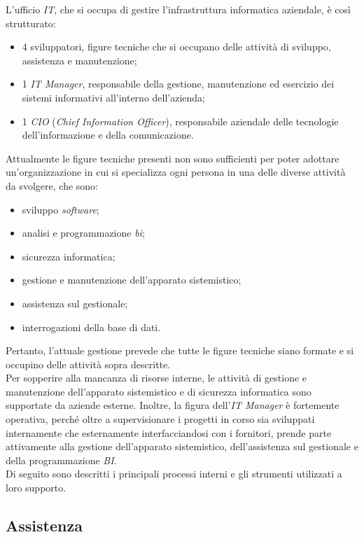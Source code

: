 L'ufficio \textit{IT}, che si occupa di gestire l'infrastruttura informatica aziendale, è così strutturato: 
\begin{itemize}
	\item 4 sviluppatori, figure tecniche che si occupano delle attività di sviluppo, assistenza e manutenzione; 
	\item 1 \textit{IT Manager}, responsabile della gestione, manutenzione ed esercizio dei sistemi informativi all'interno dell'azienda; 
	\item 1 \textit{CIO} (\textit{Chief Information Officer}), responsabile aziendale delle tecnologie dell'informazione e della comunicazione.
\end{itemize}

Attualmente le figure tecniche presenti non sono sufficienti per poter adottare un'organizzazione in cui si specializza ogni persona in una delle diverse attività da svolgere, che sono:
\begin{itemize}
\item sviluppo \textit{software}; 
\item analisi e programmazione \textit{\gls{bi}\glsfirstoccur}; 
\item sicurezza informatica; 
\item gestione e manutenzione dell'apparato sistemistico; 
\item assistenza sul gestionale; 
\item interrogazioni della base di dati.
\end{itemize}
Pertanto, l'attuale gestione prevede che tutte le figure tecniche siano formate e si occupino delle attività sopra descritte.\\
Per sopperire alla mancanza di risorse interne, le attività di gestione e manutenzione dell'apparato sistemistico e di sicurezza informatica sono supportate da aziende esterne. 
Inoltre, la figura dell'\textit{IT Manager} è fortemente operativa, perché oltre a supervisionare i progetti in corso sia sviluppati internamente che esternamente interfacciandosi con i fornitori, prende parte attivamente alla gestione dell'apparato sistemistico, dell'assistenza sul gestionale e della programmazione \textit{BI}.\\
Di seguito sono descritti i principali processi interni e gli strumenti utilizzati a loro supporto.


\subsection{Assistenza}

